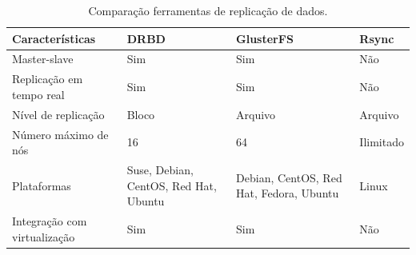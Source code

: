 \begin{table}[h!]
\caption{Comparação ferramentas de replicação de dados.}
\label{tab:replicacao}
\begin{center}
\begin{tabular}{|l|p{3.5cm}|p{3.5cm}|p{2cm}|}\hline
\textbf{Características} & \textbf{DRBD} & \textbf{GlusterFS} & \textbf{Rsync} \\\hline
Master-slave & Sim & Sim & Não \\\hline
Replicação em tempo real & Sim & Sim & Não \\\hline
Nível de replicação & Bloco & Arquivo & Arquivo \\\hline
Número máximo de nós & 16 & 64 & Ilimitado \\\hline
Plataformas & Suse, Debian, CentOS, Red Hat, Ubuntu & Debian, CentOS, Red Hat, Fedora, Ubuntu & Linux \\\hline
Integração com virtualização & Sim & Sim & Não \\\hline
\end{tabular}
\end{center}
\end{table}






